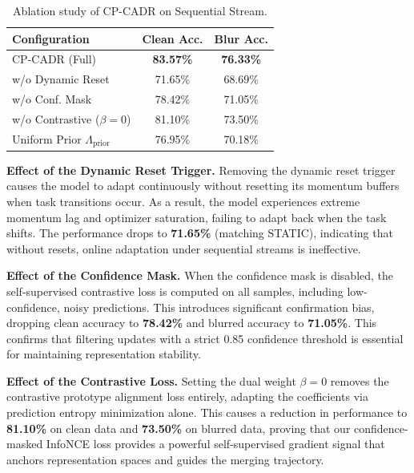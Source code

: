 \documentclass{article}
\theoremstyle{plain}
\theoremstyle{definition}
\theoremstyle{remark}
\begin{document}
\begin{table}[h]
\caption{Ablation study of CP-CADR on Sequential Stream.}
\label{tab:ablation}
\begin{center}
\begin{small}
\begin{tabular}{lcc}
\toprule
Configuration & Clean Acc. & Blur Acc. \\
\midrule
CP-CADR (Full) & \textbf{83.57\%} & \textbf{76.33\%} \\
w/o Dynamic Reset & 71.65\% & 68.69\% \\
w/o Conf. Mask & 78.42\% & 71.05\% \\
w/o Contrastive ($\beta=0$) & 81.10\% & 73.50\% \\
Uniform Prior $\Lambda_{\text{prior}}$ & 76.95\% & 70.18\% \\
\bottomrule
\end{tabular}
\end{small}
\end{center}
\end{table}

\textbf{Effect of the Dynamic Reset Trigger.} Removing the dynamic reset trigger causes the model to adapt continuously without resetting its momentum buffers when task transitions occur. As a result, the model experiences extreme momentum lag and optimizer saturation, failing to adapt back when the task shifts. The performance drops to \textbf{71.65\%} (matching STATIC), indicating that without resets, online adaptation under sequential streams is ineffective.

\textbf{Effect of the Confidence Mask.} When the confidence mask is disabled, the self-supervised contrastive loss is computed on all samples, including low-confidence, noisy predictions. This introduces significant confirmation bias, dropping clean accuracy to \textbf{78.42\%} and blurred accuracy to \textbf{71.05\%}. This confirms that filtering updates with a strict 0.85 confidence threshold is essential for maintaining representation stability.

\textbf{Effect of the Contrastive Loss.} Setting the dual weight $\beta = 0$ removes the contrastive prototype alignment loss entirely, adapting the coefficients via prediction entropy minimization alone. This causes a reduction in performance to \textbf{81.10\%} on clean data and \textbf{73.50\%} on blurred data, proving that our confidence-masked InfoNCE loss provides a powerful self-supervised gradient signal that anchors representation spaces and guides the merging trajectory.
\end{document}

